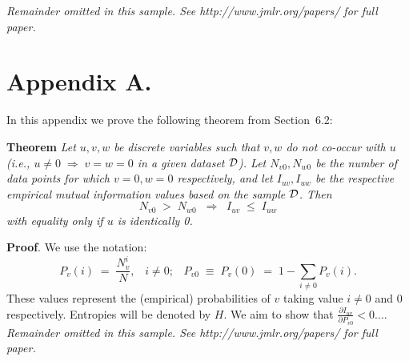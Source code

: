 \documentclass[twoside,11pt]{article}
\newcommand{\dataset}{{\cal D}}
\newcommand{\fracpartial}[2]{\frac{\partial #1}{\partial  #2}}
\begin{document}
{\noindent \em Remainder omitted in this sample. See http://www.jmlr.org/papers/ for full paper.}




\newpage

\appendix
\section*{Appendix A.}
\label{app:theorem}



In this appendix we prove the following theorem from
Section~6.2:

\noindent
{\bf Theorem} {\it Let $u,v,w$ be discrete variables such that $v, w$ do
not co-occur with $u$ (i.e., $u\neq0\;\Rightarrow \;v=w=0$ in a given
dataset $\dataset$). Let $N_{v0},N_{w0}$ be the number of data points for
which $v=0, w=0$ respectively, and let $I_{uv},I_{uw}$ be the
respective empirical mutual information values based on the sample
$\dataset$. Then
\[
	N_{v0} \;>\; N_{w0}\;\;\Rightarrow\;\;I_{uv} \;\leq\;I_{uw}
\]
with equality only if $u$ is identically 0.} \hfill\BlackBox

\noindent
{\bf Proof}. We use the notation:
\[
P_v(i) \;=\;\frac{N_v^i}{N},\;\;\;i \neq 0;\;\;\;
P_{v0}\;\equiv\;P_v(0)\; = \;1 - \sum_{i\neq 0}P_v(i).
\]
These values represent the (empirical) probabilities of $v$
taking value $i\neq 0$ and 0 respectively.  Entropies will be denoted
by $H$. We aim to show that $\fracpartial{I_{uv}}{P_{v0}} < 0$....\\

{\noindent \em Remainder omitted in this sample. See http://www.jmlr.org/papers/ for full paper.}


\vskip 0.2in

\end{document}
